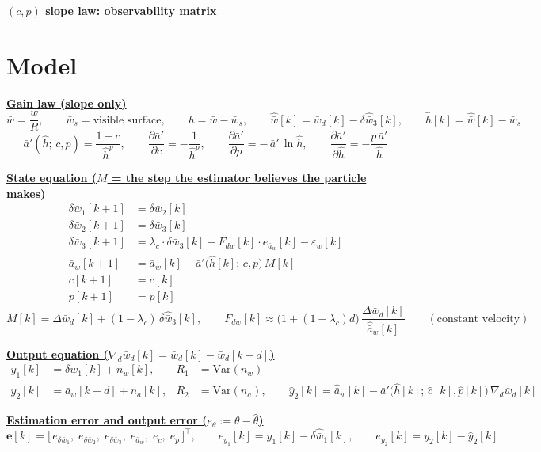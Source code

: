 \documentclass[11pt,a4paper]{ctexart}
\newcommand{\lc}{\lambda_c}
\newcommand{\ba}{\bar{a}}
\newcommand{\bw}{\bar{w}}
\newcommand{\dW}{\Delta\bw}
\newcommand{\ap}{\ba'}
\newcommand{\ah}{\hat{\ba}_w}
\newcommand{\wh}{\hat{\bw}}
\newcommand{\hh}{\hat{h}}
\newcommand{\ch}{\hat{c}}
\newcommand{\ph}{\hat{p}}
\newcommand{\hd}[1]{\par\bigskip\noindent\underline{\textbf{#1}}}
\begin{document}
\begin{center}\textbf{\large $(c, p)$ slope law: observability matrix}\end{center}

\section{Model}

\hd{Gain law (slope only)}
\[
\bw = \frac{w}{R}, \qquad \bw_s = \text{visible surface}, \qquad h = \bw - \bw_s, \qquad
\wh[k] = \bw_d[k] - \delta\wh_3[k], \qquad \hh[k] = \wh[k] - \bw_s
\]
\[
\ap(\hh;\,c,p) = \frac{1 - c}{\hh^{p}}, \qquad
\frac{\partial\ap}{\partial c} = -\frac{1}{\hh^{p}}, \qquad
\frac{\partial\ap}{\partial p} = -\,\ap\,\ln\hh, \qquad
\frac{\partial\ap}{\partial\hh} = -\frac{p\,\ap}{\hh}
\]

\hd{State equation ($M$ = the step the estimator believes the particle makes)}
\[
\begin{aligned}
\delta\bw_1[k+1] &= \delta\bw_2[k] \\
\delta\bw_2[k+1] &= \delta\bw_3[k] \\
\delta\bw_3[k+1] &= \lc \cdot \delta\bw_3[k] - F_{dw}[k]\cdot e_{\ba_w}[k] - \varepsilon_w[k] \\
\ba_w[k+1] &= \ba_w[k] + \ap\big(\hh[k];\,c,p\big)\,M[k] \\
c[k+1] &= c[k] \\
p[k+1] &= p[k]
\end{aligned}
\]
\[
M[k] = \dW_d[k] + (1-\lc)\,\delta\wh_3[k], \qquad
F_{dw}[k] \approx \big(1 + (1-\lc)d\big)\,\dfrac{\dW_d[k]}{\ah[k]} \qquad (\text{constant velocity})
\]

\hd{Output equation ($\nabla_d\bw_d[k] = \bw_d[k] - \bw_d[k-d]$)}
\[
\begin{aligned}
y_1[k] &= \delta\bw_1[k] + n_w[k], & R_1 &= \mathrm{Var}(n_w) \\
y_2[k] &= \ba_w[k-d] + n_a[k], & R_2 &= \mathrm{Var}(n_a), \qquad
\hat y_2[k] = \ah[k] - \ap\big(\hh[k];\,\ch[k],\ph[k]\big)\,\nabla_d\bw_d[k]
\end{aligned}
\]

\hd{Estimation error and output error ($e_\theta := \theta - \hat\theta$)}
\[
\mathbf{e}[k] = \big[\,e_{\delta\bw_1},\; e_{\delta\bw_2},\; e_{\delta\bw_3},\; e_{\ba_w},\; e_c,\; e_p\,\big]^{\top}, \qquad
e_{y_1}[k] = y_1[k] - \delta\wh_1[k], \qquad e_{y_2}[k] = y_2[k] - \hat y_2[k]
\]
\end{document}
